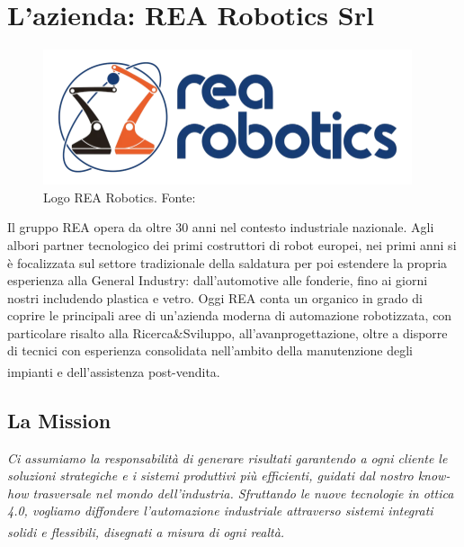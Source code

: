 \section{L'azienda: REA Robotics Srl}

\begin{figure} [ht]
    \centering
    \includegraphics[width=0.5\linewidth]{Immagini/LogoREA.png}
    \caption{Logo REA Robotics. Fonte: \cite{rearoboticsLOGO}}
    \label{fig:LogoREA.png}
\end{figure}

Il gruppo REA opera da oltre 30 anni nel contesto industriale nazionale. Agli albori partner tecnologico dei primi costruttori di robot europei, nei primi anni si è focalizzata sul settore tradizionale della saldatura per poi estendere la propria esperienza alla General Industry: dall'automotive alle fonderie, fino ai giorni nostri includendo plastica e vetro. Oggi REA conta un organico in grado di coprire le principali aree di un'azienda moderna di automazione robotizzata, con particolare risalto alla Ricerca\&Sviluppo, all'avanprogettazione, oltre a disporre di tecnici con esperienza consolidata nell'ambito della manutenzione degli impianti e dell'assistenza post-vendita.\textsuperscript{\cite{spaziowebpdf}}

\subsection{La Mission}
\textit{Ci assumiamo la responsabilità di generare risultati garantendo a ogni cliente le soluzioni strategiche e i sistemi produttivi più efficienti, guidati dal nostro know-how trasversale nel mondo dell'industria. Sfruttando le nuove tecnologie in ottica 4.0, vogliamo diffondere l'automazione industriale attraverso sistemi integrati solidi e flessibili, disegnati a misura di ogni realtà.}\textsuperscript{\cite{rearobotics}}


